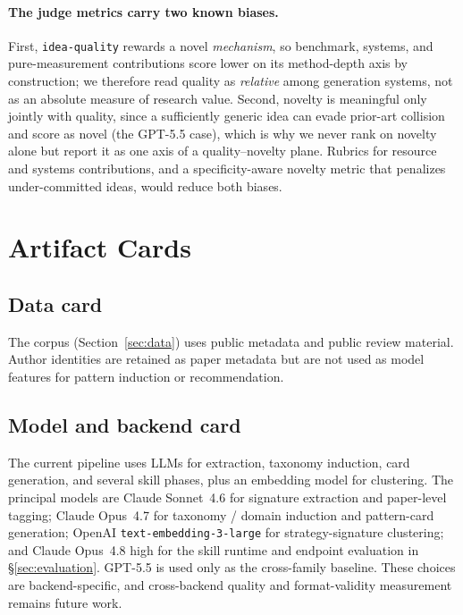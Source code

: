 \documentclass[10pt,a4paper]{article}
\begin{document}
\paragraph{The judge metrics carry two known biases.} First, \texttt{idea-quality} rewards a novel \emph{mechanism}, so benchmark, systems, and pure-measurement contributions score lower on its method-depth axis by construction; we therefore read quality as \emph{relative} among generation systems, not as an absolute measure of research value. Second, novelty is meaningful only jointly with quality, since a sufficiently generic idea can evade prior-art collision and score as novel (the GPT-5.5 case), which is why we never rank on novelty alone but report it as one axis of a quality--novelty plane. Rubrics for resource and systems contributions, and a specificity-aware novelty metric that penalizes under-committed ideas, would reduce both biases.

\section{Artifact Cards}
\label{sec:release}

\subsection{Data card}

The corpus (Section~\ref{sec:data}) uses public metadata and public review material. Author identities are retained as paper metadata but are not used as model features for pattern induction or recommendation.

\subsection{Model and backend card}

The current pipeline uses LLMs for extraction, taxonomy induction, card generation, and several skill phases, plus an embedding model for clustering. The principal models are Claude Sonnet~4.6 for signature extraction and paper-level tagging; Claude Opus~4.7 for taxonomy / domain induction and pattern-card generation; OpenAI \texttt{text-embedding-3-large} for strategy-signature clustering; and Claude Opus~4.8 high for the skill runtime and endpoint evaluation in \S\ref{sec:evaluation}. GPT-5.5 is used only as the cross-family baseline. These choices are backend-specific, and cross-backend quality and format-validity measurement remains future work.
\end{document}
